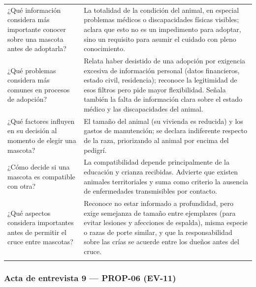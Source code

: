 \documentclass[journal,onecolumn]{IEEEtran}
\begin{document}
{\begin{longtable}{@{}p{5.6cm} p{9.4cm}@{}}
			¿Qué información considera más importante conocer sobre una mascota antes de adoptarla? & La totalidad de la condición del animal, en especial problemas médicos o discapacidades físicas visibles; aclara que esto no es un impedimento para adoptar, sino un requisito para asumir el cuidado con pleno conocimiento. \\ \addlinespace
			
			¿Qué problemas considera más comunes en procesos de adopción? & Relata haber desistido de una adopción por exigencia excesiva de información personal (datos financieros, estado civil, residencia); reconoce la legitimidad de esos filtros pero pide mayor flexibilidad. Señala también la falta de información clara sobre el estado médico y las discapacidades del animal. \\ \addlinespace
			
			¿Qué factores influyen en su decisión al momento de elegir una mascota? & El tamaño del animal (su vivienda es reducida) y los gastos de manutención; se declara indiferente respecto de la raza, priorizando al animal por encima del pedigrí. \\ \addlinespace
			
			¿Cómo decide si una mascota es compatible con otra? & La compatibilidad depende principalmente de la educación y crianza recibidas. Advierte que existen animales territoriales y suma como criterio la ausencia de enfermedades transmisibles por contacto. \\ \addlinespace
			
			¿Qué aspectos considera importantes antes de permitir el cruce entre mascotas? & Reconoce no estar informado a profundidad, pero exige semejanza de tamaño entre ejemplares (para evitar lesiones y afecciones de espalda), misma especie o razas de porte similar, y que la responsabilidad sobre las crías se acuerde entre los dueños antes del cruce. \\ \addlinespace
			
		\end{longtable}
	}
	
	
	\subsubsection*{Acta de entrevista 9 --- PROP-06 (EV-11)}
	
\end{document}
